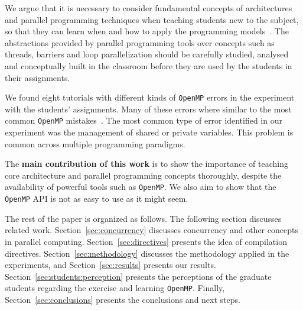 We argue that it is necessary to consider fundamental concepts of architectures and parallel programming techniques when teaching students new to the subject, so that they can learn when and how to apply the programming models~\cite{ben1999thinking}. The abstractions provided by parallel programming tools over concepts such as threads, barriers and loop parallelization should be carefully studied, analysed and conceptually built in the classroom before they are used by the students in their assignments.

We found eight tutorials with different kinds of \texttt{OpenMP} errors in the experiment with the students' assignments. Many of these errors where similar to the most common \texttt{OpenMP} mistakes~\cite{SuB:2005:CMO:1892830.1892863}. The most common type of error identified in our experiment was the management of shared or private variables. This problem is common across multiple programming paradigms.

The \textbf{main contribution of this work} is to show the importance of teaching core architecture and parallel programming concepts thoroughly, despite the availability of powerful tools such as \texttt{OpenMP}. We also aim to show that the \texttt{OpenMP} API is not as easy to use as it might seem.

The rest of the paper is organized as follows. The following section discusses related work. Section~\ref{sec:concurrency} discusses concurrency and other concepts in parallel computing. Section~\ref{sec:directives} presents the idea of compilation directives. Section~\ref{sec:methodology} discusses the methodology applied in the experiments, and Section~\ref{sec:results} presents our results. Section~\ref{sec:students:perception} presents the perceptions of the graduate students regarding the exercise and learning \texttt{OpenMP}. Finally, Section~\ref{sec:conclusions} presents the conclusions and next steps.

